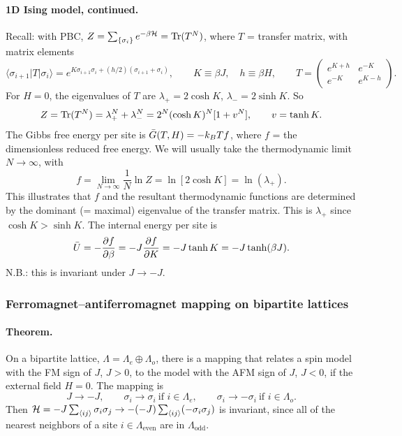 \paragraph{1D Ising model, continued.}

Recall: with PBC,
$Z = \sum_{\{\sigma_i\}}e^{-\beta\mathcal{H}} = \operatorname{Tr}(T^N)$, where $T$ = transfer matrix, with
matrix elements
\begin{equation}
  \langle\sigma_{i+1}|T|\sigma_i\rangle = e^{K\sigma_{i+1}\sigma_i+(h/2)(\sigma_{i+1}+\sigma_i)},
  \qquad K\equiv\beta J,\quad h\equiv\beta H,
  \qquad
  T = \begin{pmatrix} e^{K+h} & e^{-K}\\ e^{-K} & e^{K-h}\end{pmatrix}.
\end{equation}
For $H = 0$, the eigenvalues of $T$ are $\lambda_+ = 2\cosh K$, $\lambda_- = 2\sinh K$. So
\begin{equation}
  Z = \operatorname{Tr}(T^N) = \lambda_+^N + \lambda_-^N = 2^N(\cosh K)^N[1+v^N],\qquad v = \tanh K .
\end{equation}
The Gibbs free energy per site is $\bar G(T,H) = -k_{B} Tf$, where $f$ = the dimensionless
reduced free energy. We will usually take the thermodynamic limit $N\to\infty$, with
\begin{equation}
  f = \lim_{N\to\infty}\frac{1}{N}\ln Z = \ln[2\cosh K] = \ln(\lambda_+).
\end{equation}
This illustrates that $f$ and the resultant thermodynamic functions are determined by the
dominant (= maximal) eigenvalue of the transfer matrix. This is $\lambda_+$ since
$\cosh K>\sinh K$. The internal energy per site is
\begin{equation}
  \bar U = -\frac{\partial f}{\partial \beta} = -J\frac{\partial f}{\partial K} = -J\tanh K = -J\tanh(\beta J).
\end{equation}
N.B.: this is invariant under $J\to -J$.

\subsubsection*{Ferromagnet--antiferromagnet mapping on bipartite lattices}

\paragraph{Theorem.} On a bipartite lattice,
$\Lambda = \Lambda_e\oplus\Lambda_o$, there is a mapping that relates a spin model with the
FM sign of $J$, $J>0$, to the model with the AFM sign of $J$, $J<0$, if the external field
$H = 0$. The mapping is
\begin{equation}
  J\to -J,\qquad
  \sigma_i\to\sigma_i\ \text{if } i\in\Lambda_e,\qquad
  \sigma_i\to-\sigma_i\ \text{if } i\in\Lambda_o .
\end{equation}
Then
$\mathcal{H} = -J\sum_{\langle ij\rangle}\sigma_i\sigma_j\to-(-J)\sum_{\langle ij\rangle}(-\sigma_i\sigma_j)$
is invariant, since all of the nearest neighbors of a site $i\in\Lambda_{\text{even}}$ are
in $\Lambda_{\text{odd}}$.

